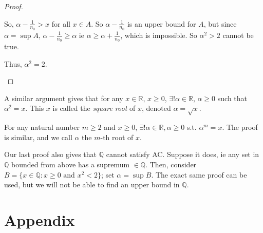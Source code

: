 \documentclass[12pt]{article}
\begin{document}
\begin{proof}[Proof]
\begin{itemize}
\begin{itemize}[label=$\bullet$]
      So, $\alpha - \frac{1}{n_0} > x$ for all $x \in A$. So $\alpha - \frac{1}{n_0}$ is an upper bound for $A$, but since $\alpha = \sup A$, $\alpha - \frac{1}{n_0} \geq \alpha$ ie $\alpha \geq \alpha + \frac{1}{n_0}$, which is impossible. So $\alpha^2 > 2$ cannot be true.
    \end{itemize}

    Thus, $\alpha^2 = 2$.
  \end{itemize}
\end{proof}


\begin{remark}
  A similar argument gives that for any $x \in \mathbb{R}$, $x \geq 0$, $\exists! \alpha \in \mathbb{R}$, $\alpha \geq 0$ such that $\alpha^2 = x$. This $x$ is called the \emph{square root} of $x$, denoted $\alpha = \sqrt{x}$.
\end{remark}

\begin{remark}
  For any natural number $m \geq 2$ and $x \geq 0$, $\exists ! \alpha \in \mathbb{R}, \alpha \geq 0$ s.t. $\alpha^m = x$. The proof is similar, and we call $\alpha$ the $m$-th root of $x$.
\end{remark}

\begin{remark}
  Our last proof also gives that $\mathbb{Q}$ cannot satisfy AC. Suppose it does, ie any set in $\mathbb{Q}$ bounded from above has a supremum $\in \mathbb{Q}$. Then, consider $B = \{x \in \mathbb{Q} : x \geq 0 \text{ and } x^2 < 2\}$; set $\alpha = \sup B$. The exact same proof can be used, but we will not be able to find an upper bound in $\mathbb{Q}$.
\end{remark}


\newpage
\section{Appendix}
\end{document}
